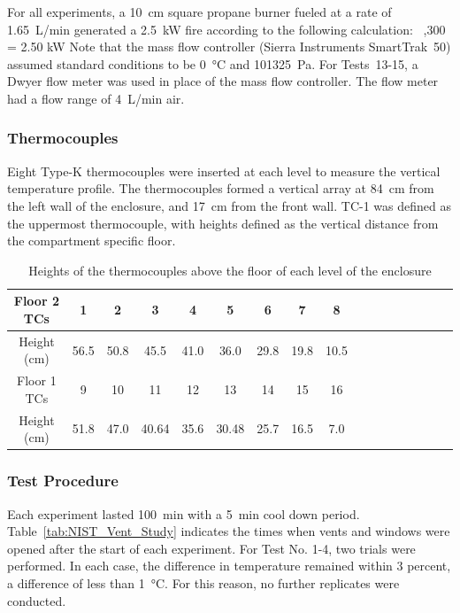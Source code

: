 For all experiments, a 10~cm square propane burner fueled at a rate of 1.65~L/min generated a 2.5~kW fire according to the following calculation:
  \times {}  \times {}   \,  ,300 \,  = 2.50 \; {\rm kW}
\label{Conversion_Equation}
\ee
Note that the mass flow controller (Sierra Instruments SmartTrak~50) assumed standard conditions to be 0~\unit{\degreeCelsius} and 101325~Pa. For Tests~13-15, a Dwyer flow meter was used in place of the mass flow controller. The flow meter had a flow range of 4~L/min air.

\subsubsection{Thermocouples}

Eight Type-K thermocouples were inserted at each level to measure the vertical temperature profile. The thermocouples formed a vertical array at 84~cm from the left wall of the enclosure, and 17~cm from the front wall. TC-1 was defined as the uppermost thermocouple, with heights defined as the vertical distance from the compartment specific floor.

\begin{table}[h!]
\caption{Heights of the thermocouples above the floor of each level of the enclosure}
\begin{center}
\begin{tabular}{|c|c|c|c|c|c|c|c|c|c|c|c|c|c|c|c|c|}
\hline
Floor 2 TCs    & 1& 2& 3 & 4& 5& 6& 7&8\\ \hline
Height (cm) & 56.5& 50.8& 45.5& 41.0& 36.0& 29.8& 19.8& 10.5\\ \hline
Floor 1 TCs  & 9&10&11&12&13&14&15&16\\ \hline
Height (cm) &51.8&47.0&40.64&35.6&30.48&25.7& 16.5&7.0\\ \hline


\end{tabular}
\end{center}
\label{Tab.TC}
\end{table}

\subsubsection{Test Procedure}

Each experiment lasted 100~min with a 5~min cool down period. Table~\ref{tab:NIST_Vent_Study} indicates the times when vents and windows were opened after the start of each experiment. For Test No. 1-4, two trials were performed. In each case, the difference in temperature remained within 3 percent, a difference of less than 1~\unit{\degreeCelsius}. For this reason, no further replicates were conducted.


